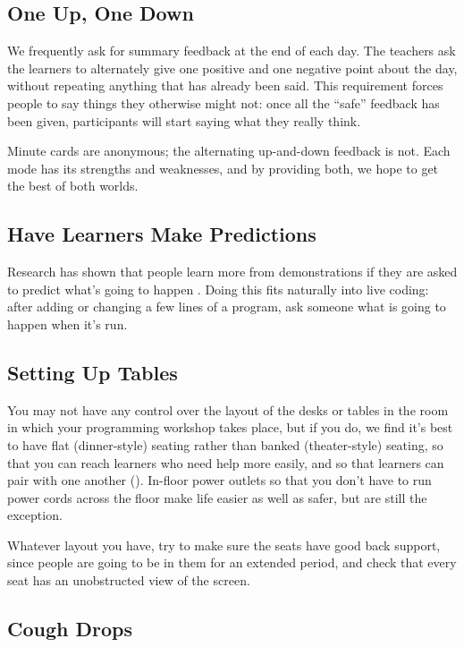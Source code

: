 \subsection*{One Up, One Down}

We frequently ask for summary feedback at the end of each day. The
teachers ask the learners to alternately give one positive and one
negative point about the day, without repeating anything that has
already been said. This requirement forces people to say things they
otherwise might not: once all the ``safe'' feedback has been given,
participants will start saying what they really think.

Minute cards are anonymous; the alternating up-and-down feedback is
not.  Each mode has its strengths and weaknesses, and by providing
both, we hope to get the best of both worlds.

\subsection*{Have Learners Make Predictions}

Research has shown that people learn more from demonstrations if they
are asked to predict what's going to happen \cite{Mill2013}. Doing
this fits naturally into live coding: after adding or changing a few
lines of a program, ask someone what is going to happen when it's run.

\subsection*{Setting Up Tables}

You may not have any control over the layout of the desks or tables in
the room in which your programming workshop takes place, but if you
do, we find it's best to have flat (dinner-style) seating rather than
banked (theater-style) seating, so that you can reach learners who
need help more easily, and so that learners can pair with one another
().  In-floor power outlets so that you
don't have to run power cords across the floor make life easier as
well as safer, but are still the exception.

Whatever layout you have, try to make sure the seats have good back
support, since people are going to be in them for an extended period,
and check that every seat has an unobstructed view of the screen.

\subsection*{Cough Drops}

